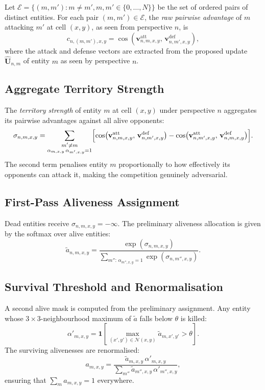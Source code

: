 \documentclass[11pt,a4paper]{article}
\newcommand{\vatt}{\mathbf{v}^{\mathrm{att}}}
\newcommand{\vdef}{\mathbf{v}^{\mathrm{def}}}
\newcommand{\cosim}[2]{\cos\!\left(#1,\,#2\right)}
\theoremstyle{definition}
\begin{document}
Let $\mathcal{E} = \{(m,m') : m \neq m', m,m' \in \{0,\ldots,N\}\}$ be the set of ordered pairs of distinct entities. For each pair $(m,m') \in \mathcal{E}$, the \emph{raw pairwise advantage} of $m$ attacking $m'$ at cell $(x,y)$, as seen from perspective $n$, is
\[
    c_{n,(m,m'),x,y}
    = \cosim{\vatt_{n,m,x,y}}{\vdef_{n,m',x,y}},
\]
where the attack and defense vectors are extracted from the proposed update $\hat{\mathbf{U}}_{n,m}$ of entity $m$ as seen by perspective $n$.

\subsection{Aggregate Territory Strength}

The \emph{territory strength} of entity $m$ at cell $(x,y)$ under perspective $n$ aggregates its pairwise advantages against all alive opponents:
\[
    \sigma_{n,m,x,y}
    = \sum_{\substack{m' \neq m \\ \alpha_{m,x,y}\,\alpha_{m',x,y}=1}}
    \Bigl[\cosim{\vatt_{n,m,x,y}}{\vdef_{n,m',x,y}}
    - \cosim{\vatt_{n,m',x,y}}{\vdef_{n,m,x,y}}\Bigr].
\]
The second term penalises entity $m$ proportionally to how effectively its opponents can attack it, making the competition genuinely adversarial.

\subsection{First-Pass Aliveness Assignment}

Dead entities receive $\sigma_{n,m,x,y} = -\infty$. The preliminary aliveness allocation is given by the softmax over alive entities:
\[
    \tilde{a}_{n,m,x,y}
    = \frac{\exp\!\left(\sigma_{n,m,x,y}\right)}
           {\sum_{m'':\,\alpha_{m'',x,y}=1} \exp\!\left(\sigma_{n,m'',x,y}\right)}.
\]

\subsection{Survival Threshold and Renormalisation}

A second alive mask is computed from the preliminary assignment. Any entity whose $3\times3$-neighbourhood maximum of $\tilde{a}$ falls below $\theta$ is killed:
\[
    \alpha'_{m,x,y} = \mathbf{1}\!\left[\max_{(x',y')\in\mathcal{N}(x,y)} \tilde{a}_{m,x',y'} > \theta \right].
\]
The surviving alivenesses are renormalised:
\[
    a_{m,x,y} = \frac{\tilde{a}_{m,x,y}\,\alpha'_{m,x,y}}
                     {\sum_{m''} \tilde{a}_{m'',x,y}\,\alpha'_{m'',x,y}},
\]
ensuring that $\sum_m a_{m,x,y} = 1$ everywhere.
\end{document}
